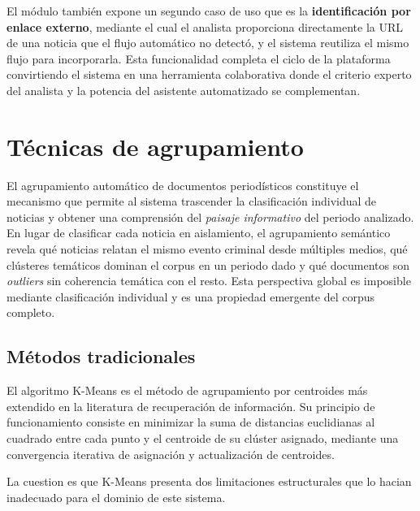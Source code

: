 El módulo también expone un segundo caso de uso que es la \textbf{identificación por enlace externo},
mediante el cual el analista proporciona directamente la URL de una noticia que el flujo automático no detectó,
y el sistema reutiliza el mismo flujo para incorporarla. Esta funcionalidad completa el ciclo de la plataforma
convirtiendo el sistema en una herramienta colaborativa donde el criterio experto del analista y la potencia del
asistente automatizado se complementan.

\clearpage
\section{Técnicas de agrupamiento}
\label{sec:ea_clustering}


El agrupamiento automático de documentos periodísticos constituye el mecanismo
que permite al sistema trascender la clasificación individual de noticias y obtener
una comprensión del \textit{paisaje informativo} del periodo analizado. En lugar de
clasificar cada noticia en aislamiento, el agrupamiento semántico revela qué noticias
relatan el mismo evento criminal desde múltiples medios, qué clústeres temáticos
dominan el corpus en un periodo dado y qué documentos son \textit{outliers} sin
coherencia temática con el resto. Esta perspectiva global es imposible mediante
clasificación individual y es una propiedad emergente del corpus completo.

\subsection{Métodos tradicionales}
\label{subsec:ea_kmeans}

El algoritmo K-Means \cite{lloyd1982least} es el método de agrupamiento por
centroides más extendido en la literatura de recuperación de información. Su
principio de funcionamiento consiste en minimizar la suma de distancias
euclidianas al cuadrado entre cada punto y el centroide de su clúster asignado,
mediante una convergencia iterativa de asignación y actualización de centroides.

La cuestion es que K-Means presenta dos limitaciones estructurales que lo hacian
inadecuado para el dominio de este sistema.

